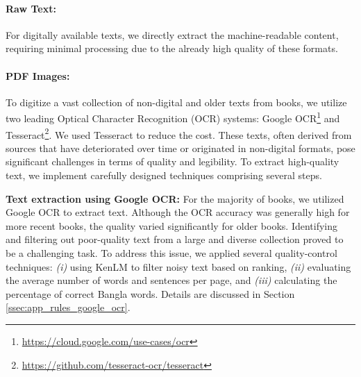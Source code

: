 
\noindent \paragraph{Raw Text:} For digitally available texts, we directly extract the machine-readable content, requiring minimal processing due to the already high quality of these formats.

\noindent \paragraph{PDF Images:} 
To digitize a vast collection of non-digital and older texts from books, we utilize two leading Optical Character Recognition (OCR) systems: Google OCR\footnote{\url{https://cloud.google.com/use-cases/ocr}} and Tesseract\footnote{\url{https://github.com/tesseract-ocr/tesseract}}. We used Tesseract to reduce the cost. These texts, often derived from sources that have deteriorated over time or originated in non-digital formats, pose significant challenges in terms of quality and legibility. To extract high-quality text, we implement carefully designed techniques comprising several steps.

\noindent \textbf{Text extraction using Google OCR:} For the majority of books, we utilized Google OCR to extract text. Although the OCR accuracy was generally high for more recent books, the quality varied significantly for older books. Identifying and filtering out poor-quality text from a large and diverse collection proved to be a challenging task. To address this issue, we applied several quality-control techniques: \textit{(i)} using KenLM \cite{heafield2011kenlm} to filter noisy text based on ranking, \textit{(ii)} evaluating the average number of words and sentences per page, and \textit{(iii)} calculating the percentage of correct Bangla words. Details are discussed in Section \ref{ssec:app_rules_google_ocr}.

